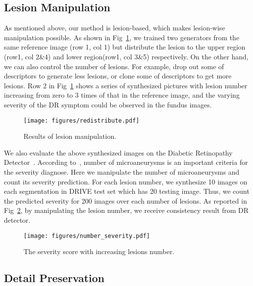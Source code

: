 \documentclass[letterpaper]{article} %
\begin{document}
    \subsection{Lesion Manipulation}

	As mentioned above, our method is lesion-based, which makes lesion-wise manipulation possible. As shown in Fig~\ref{fig:redistribute}, we trained two generators from the same reference image (row 1, col 1) but distribute the lesion to the upper region (row1, col 2\&4) and lower region(row1, col 3\&5) respectively. On the other hand, we can also control the number of lesions. For example, drop out some of descriptors to generate less lesions, or clone some of descriptors to get more lesions. Row 2 in Fig~\ref{fig:redistribute} shows a series of synthesized pictures with lesion number increasing from zero to 3 times of that in the reference image, and the varying severity of the DR symptom could be observed in the fundus images.



	\begin{figure}[h!]
		\begin{center}
			\texttt{[image: figures/redistribute.pdf]}
		\end{center}
		\caption{Results of lesion manipulation.}
		\label{fig:redistribute}
        \end{figure}


  We also evaluate the above synthesized images on the Diabetic Retinopathy Detector~\cite{oO2016detector}.  According to~\cite{aao2002drscale}, number of microaneurysms is an important criteria for the severity diagnose.  Here we manipulate the number of microaneurysms and count its severity prediction. For each lesion number, we synthesize 10 images on each segmentation in DRIVE test set which has 20 testing image. Thus, we count the predicted severity for 200 images over each number of lesions. As reported in Fig~\ref{fig:number_severity}, by manipulating the lesion number, we receive consistency result from DR detector.

  	\begin{figure}[t]
		\begin{center}
			\texttt{[image: figures/number\_severity.pdf]}
		\end{center}
		\caption{The severity score with increasing lesions number.}
		\label{fig:number_severity}
	\end{figure}

    \subsection{Detail Preservation}
    \label{sec:exp_detail}
\end{document}
